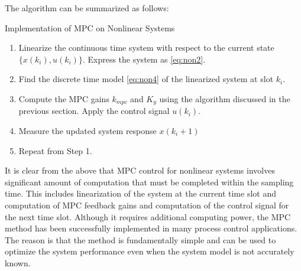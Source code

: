             The algorithm can be summarized as follows:
            \begin{alg}
                Implementation of MPC on Nonlinear Systems
                \begin{enumerate}
                    \item Linearize the continuous time system with respect to the current state $\{x(k_i), u(k_i)\}$.  Express the system as \eqref{eq:non2}.
                    \item Find the discrete time model \eqref{eq:non4} of the linearized system at slot $k_i$.
                    \item Compute the MPC gains $k_{mpc}$ and $K_y$ using the algorithm discussed in the previous section.  Apply the control signal $u(k_i)$.
                    \item Measure the updated system response $x(k_i+1)$
                    \item Repeat from Step 1.
                \end{enumerate}
                \label{algorithm:NonLinMPC}
            \end{alg}
            
            It is clear from the above that MPC control for nonlinear systems involves significant amount of computation that must be completed within the sampling time. This includes linearization of the system at the current time slot and computation of MPC feedback gains and computation of the control signal for the next time slot. Although it requires additional computing power, the MPC method has been successfully implemented in many process control applications. The reason is that the method is fundamentally simple and can be used to optimize the system performance even when the system model is not accurately known. 
    